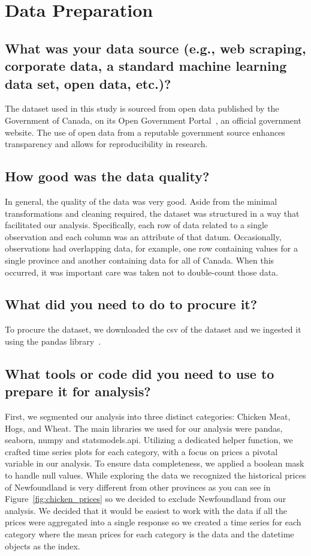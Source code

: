 \section{Data Preparation}

\subsection{What was your data source (e.g., web scraping, corporate data, a standard machine learning data set, open data, etc.)?}

The dataset used in this study is sourced from open data published by the Government of Canada, on its Open Government Portal~\cite{ogp}, an official government website.
The use of open data from a reputable government source enhances transparency and allows for reproducibility in research.

\subsection{How good was the data quality?}

In general, the quality of the data was very good.
Aside from the minimal transformations and cleaning required, the dataset was structured in a way that facilitated our analysis.
Specifically, each row of data related to a single observation and each column was an attribute of that datum.
Occasionally, observations had overlapping data, for example, one row containing values for a single province and another containing data for all of Canada.
When this occurred, it was important care was taken not to double-count those data.

\subsection{What did you need to do to procure it?}

To procure the dataset, we downloaded the csv of the dataset and we ingested it using the pandas library~\cite{pandas}.

\subsection{What tools or code did you need to use to prepare it for analysis?}

First, we segmented our analysis into three distinct categories: Chicken Meat, Hogs, and Wheat.
The main libraries we used for our analysis were pandas, seaborn, numpy and statsmodels.api.
Utilizing a dedicated helper function, we crafted time series plots for each category, with a focus on prices \textemdash a pivotal variable in our analysis.
To ensure data completeness, we applied a boolean mask to handle null values.
While exploring the data we recognized the historical prices of Newfoundland is very different from other provinces as you can see in Figure~\ref{fig:chicken_prices} so we decided to exclude Newfoundland from our analysis.
We decided that it would be easiest to work with the data if all the prices were aggregated into a single response so we created a time series for each category where the mean prices for each category is the data and the datetime objects as the index.

